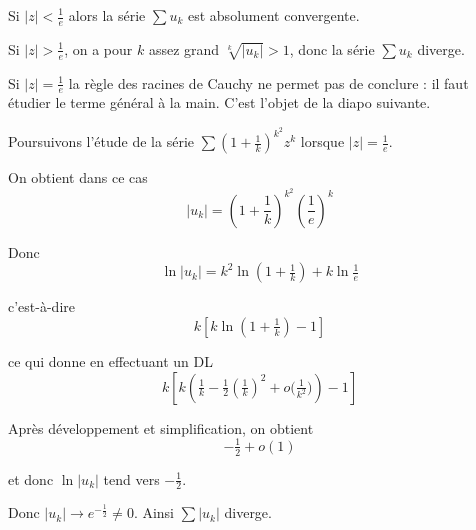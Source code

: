\change
Si $|z|<\frac{1}{e}$ alors la série $\sum u_k$ est absolument 
convergente.
  
\change
Si $|z|>\frac{1}{e}$, on a pour $k$ assez grand $\sqrt[k]{|u_k|}>1$, donc la série $\sum u_k$ diverge.
  
\change
Si $|z|=\frac{1}{e}$ la règle des racines de Cauchy ne permet pas de conclure : il faut étudier le terme général à la main. C'est l'objet de la diapo suivante.

\diapo
Poursuivons l'étude de  la série $\sum \left( 1+\frac{1}{k}\right)^{k^2} z^k$ lorsque $|z|=\frac{1}{e}$.

\change
On obtient dans ce cas 
  $$|u_k|=\left(  1+\frac{1}{k}\right)^{k^2}\left(\frac{1}{e}\right)^k$$
  
\change
Donc
$$
\ln|u_k| = k^2\ln\left(1+\tfrac{1}{k}\right)+k\ln \tfrac{1}{e} 
$$

\change
c'est-à-dire
$$
 k\left[k\ln (1+\tfrac{1}{k})-1\right] 
$$

\change
ce qui donne en effectuant un DL
$$
k \left[ k\left(\tfrac{1}{k}-\tfrac{1}{2}\left( \tfrac{1}{k}\right)^2+
o\big( \tfrac{1}{k^2}\big) \right)-1\right]
$$

\change
Après développement et simplification, on obtient
$$
-\tfrac{1}{2} +o(1)
$$

\change
et donc $\ln|u_k| $ tend vers $-\tfrac{1}{2}$.

\change
Donc $|u_k| \to e^{-\frac{1}{2}}\neq 0$. Ainsi $\sum |u_k|$ diverge. 

